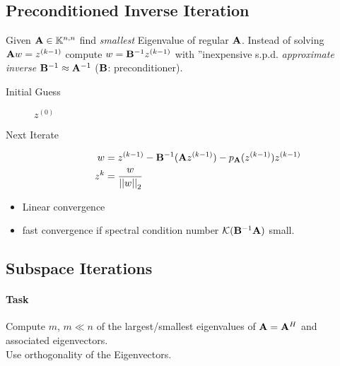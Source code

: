 	\subsection{Preconditioned Inverse Iteration}
		Given $\mathbf{A} \in \mathbb{K}^{n,n}$ find \emph{smallest} Eigenvalue of regular $\mathbf{A}$. Instead of solving $\mathbf{A} w =z^{(k-1)}$ compute $w = \mathbf{B}^{-1}z^{(k-1)}$ with ''inexpensive s.p.d. \emph{approximate inverse} $\mathbf{B}^{-1} \approx \mathbf{A}^{-1}$ ($\mathbf{B}$: preconditioner).

		\begin{description}
			\item[Initial Guess] $z^{(0)}$
			\item[Next Iterate]
				\begin{align*}
					w &= z^{(k-1)} - \mathbf{B}^{-1}(\mathbf{A} z^{(k-1)}) - p_{\mathbf{A}} (z^{(k-1)}) z^{(k-1)}\\
					z^{k} &= \frac{w}{\left|\left| w \right|\right|_2}
				\end{align*}
		\end{description}

		\begin{itemize}
			\item Linear convergence
			\item fast convergence if spectral condition number $\mathcal K(\mathbf{B}^{-1} \mathbf{A})$ small.
		\end{itemize}
	\subsection{Subspace Iterations}
		\paragraph{Task} Compute $m$, $m \ll n$ of the largest/smallest eigenvalues of $\mathbf{A} = \mathbf{A}^H$ and associated eigenvectors.\\

		Use orthogonality of the Eigenvectors.
